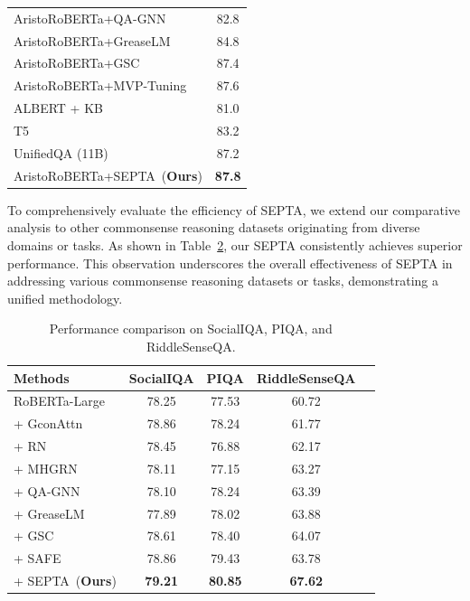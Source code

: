 \documentclass[runningheads]{llncs}
\begin{document}
\begin{table}[t!]
\begin{minipage}[c]{0.52\textwidth}
{\begin{tabular}{lc}
AristoRoBERTa+QA-GNN~\cite{ref:qagnn}       & 82.8 \\
AristoRoBERTa+GreaseLM~\cite{ref:greaselm}  & 84.8 \\
AristoRoBERTa+GSC~\cite{ref:gsc}  & 87.4 \\
AristoRoBERTa+MVP-Tuning~\cite{ref:mvp}  & 87.6 \\
ALBERT + KB                        & 81.0 \\
T5               & 83.2 \\
UnifiedQA (11B)~\cite{ref:unifiedqa}      & 87.2 \\
\midrule
AristoRoBERTa+SEPTA~(\textbf{Ours}) & \textbf{87.8} \\
\bottomrule
\end{tabular}
}
\end{minipage}
\label{tab:leaderboard}
\end{table}

To comprehensively evaluate the efficiency of SEPTA, we extend our comparative analysis to other commonsense reasoning datasets originating from diverse domains or tasks. As shown in Table~\ref{tab:other_qa}, our SEPTA consistently achieves superior performance. This observation underscores the overall effectiveness of SEPTA in addressing various commonsense reasoning datasets or tasks, demonstrating a unified methodology.
\begin{table}[t!]
\centering
\caption{Performance comparison on SocialIQA, PIQA, and RiddleSenseQA.}
\resizebox{0.55\linewidth}{!} {
\begin{tabular}{lcccc}
    \toprule  
    \textbf{Methods}& \textbf{SocialIQA} & \textbf{PIQA} & \textbf{RiddleSenseQA}\\
    \midrule  
    RoBERTa-Large  & 78.25 & 77.53 & 60.72\\
    \midrule
    + {GconAttn} & 78.86 & 78.24 & 61.77 \\
    + {RN} & 78.45 & 76.88 &62.17 \\
    + {MHGRN} & 78.11 & 77.15 & 63.27\\
    + {QA-GNN} & 78.10 & 78.24 & 63.39 \\
    + {GreaseLM} & 77.89 & 78.02 & 63.88 \\
    + {GSC} & 78.61 &  78.40 & 64.07 \\
    + {SAFE} & 78.86 & 79.43 & 63.78 \\
    \midrule
    + {SEPTA}~(\textbf{Ours}) &  \textbf{79.21}  & \textbf{80.85} &  \textbf{67.62} \\
    \bottomrule 
\end{tabular}
}
\label{tab:other_qa}
\end{table}
\end{document}

